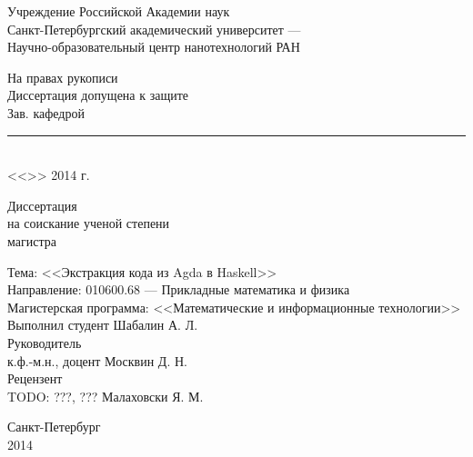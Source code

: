 \begin{titlepage}

\begin{center}
Учреждение Российской Академии наук\\
Санкт-Петербургский академический университет ---\\
Научно-образовательный центр нанотехнологий РАН
\end{center}

\vspace{1cm}

\begin{flushright}
\begin{minipage}{0.5\textwidth}
\begin{center}
На правах рукописи\\[.5cm]
Диссертация допущена к защите\\
Зав. кафедрой\\[.3cm]
\rule{7cm}{.5pt}\\
<<\hspace{.8cm}>> \underline{\hspace{3.5cm}} 2014 г.\\
\end{center}
\end{minipage}
\end{flushright}

\vspace{1cm}

\begin{center}
Диссертация\\
на соискание ученой степени\\
магистра
\end{center}

\begin{flushleft}
Тема: <<Экстракция кода из Agda в Haskell>>\\[.5cm]

Направление: 010600.68 --- Прикладные математика и физика\\[.5cm]

Магистерская программа: <<Математические и информационные технологии>>\\[1cm]

Выполнил студент \hfill Шабалин А. Л.\\[.5cm]

Руководитель\\
к.ф.-м.н., доцент \hfill Москвин Д. Н.\\[.5cm]

Рецензент\\
TODO: ???, ??? \hfill Малаховски Я. М.
\end{flushleft}

\vfill

\begin{center}
Санкт-Петербург\\
2014
\end{center}

\end{titlepage}
